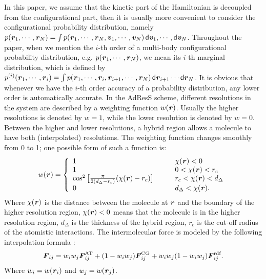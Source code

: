 \documentclass[aip,jcp,a4paper,reprint,onecolumn]{revtex4-1}
\newcommand{\bluec}[1]{{\color{blue} #1}}
\newcommand{\vect}[1]{\textbf{\textit{#1}}}
\newcommand{\dd}[1]{\textsf{#1}}
\newcommand{\AT}{{\textrm{{AT}}}}
\newcommand{\CG}{{\textrm{CG}}}
\newcommand{\HY}{{\Delta}}
\newcommand{\rdf}{{\textrm{rdf}}}
\begin{document}
  In this paper, we assume that
  the kinetic part of the Hamiltonian is decoupled from the configurational part, then
  it is usually more convenient to consider the configurational
  probability distribution, namely $ p(\vect r_1,\cdots,\vect r_N) =
  \int p(\vect r_1,\cdots,\vect r_N, \vect v_1,\cdots,\vect v_N)\,\dd d\vect v_1,\cdots,\dd d\vect v_N$.
Throughout the paper, when we mention the $i$-th order of a
  multi-body configurational probability distribution, e.g.
  $p(\vect r_1, \cdots, \vect r_N)$, we mean its $i$-th marginal
  distribution, which is defined by
  $p^{(i)}(\vect r_1, \cdots, \vect r_i)
  = \int p(\vect r_1, \cdots, \vect r_i, \vect r_{i+1}, \cdots, \vect r_N)\,
  \dd d \vect r_{i+1}\cdots\dd d \vect r_N$.
  It is obvious that
  whenever we have the $i$-th order accuracy of a probability distribution,
  any lower  order is automatically accurate.
In the AdResS scheme,
different resolutions in the system are described by a weighting
function $w(\vect r)$. Usually the higher resolutions is
denoted by $w = 1$, while the lower resolution is denoted by $w = 0$.
Between the higher and lower resolutions, a hybrid region allows a 
molecule to have both (interpolated) resolutions. The weighting function changes smoothly
from 0 to 1; one possible form of such a function is:
\bluec{
\begin{align}\label{eqn:new-w}
  w(\vect r) =
  \left\{
    \begin{array}{lcl}
      1 &\quad& \chi(\vect r) < 0\\
      1  && 0 < \chi(\vect r) < r_c\\
      \cos^2\big[\frac{\pi}{2(d_{\HY} - r_c)} (\chi(\vect r) - r_c)\big] && r_c < \chi(\vect r) < d_{\HY} \\
      0 &&  d_{\HY}  < \chi(\vect r).
    \end{array}
  \right.
\end{align}
Where $\chi(\vect r)$ is the distance between the
molecule at $\vect r$ and the boundary of the higher resolution
region, $\chi(\vect r) < 0$ }means that the molecule is in the higher resolution
region, $d_{\HY}$ is the thickness of the hybrid region, $r_c$ is the
cut-off radius of the atomistic interactions.  The intermolecular force is modeled by the following
interpolation formula \cite{rdfcorr}:
\bluec{
\begin{align}
  \vect F_{ij} =
  w_i w_j\vect F^{\AT}_{ij} +
  (1-w_i w_j)\vect F^{\CG}_{i j} +
  w_i w_j (1-w_i w_j)\vect F_{ij}^{\rdf}.
\label{grf}
\end{align}
Where $w_i = w(\vect r_i)$ and $w_j = w(\vect r_j)$.}
\end{document}
